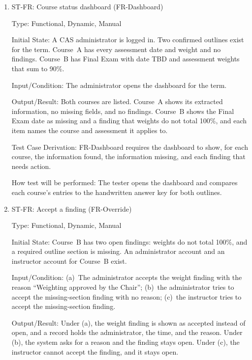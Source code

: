\documentclass[12pt, titlepage]{article}
\newcounter{stnum}
\begin{document}
\begin{enumerate}

\item{ST-FR\thestnum \label{ST_Dashboard}: Course status dashboard (FR-Dashboard)\\}

Type: Functional, Dynamic, Manual

Initial State: A CAS administrator is logged in. Two confirmed outlines exist for the term. Course~A has every assessment date and weight and no findings. Course~B has Final Exam with date TBD and assessment weights that sum to 90\%.

Input/Condition: The administrator opens the dashboard for the term.

Output/Result: Both courses are listed. Course~A shows its extracted information, no missing fields, and no findings. Course~B shows the Final Exam date as missing and a finding that weights do not total 100\%, and each item names the course and assessment it applies to.

Test Case Derivation: FR-Dashboard requires the dashboard to show, for each course, the information found, the information missing, and each finding that needs action.

How test will be performed: The tester opens the dashboard and compares each course's entries to the handwritten answer key for both outlines.


\item{ST-FR\thestnum \label{ST_Override}: Accept a finding (FR-Override)\\}

Type: Functional, Dynamic, Manual

Initial State: Course~B has two open findings: weights do not total 100\%, and a required outline section is missing. An administrator account and an instructor account for Course~B exist.

Input/Condition: (a)~The administrator accepts the weight finding with the reason ``Weighting approved by the Chair''; (b)~the administrator tries to accept the missing-section finding with no reason; (c)~the instructor tries to accept the missing-section finding.

Output/Result: Under (a), the weight finding is shown as accepted instead of open, and a record holds the administrator, the time, and the reason. Under (b), the system asks for a reason and the finding stays open. Under (c), the instructor cannot accept the finding, and it stays open.


\end{enumerate}
\end{document}

